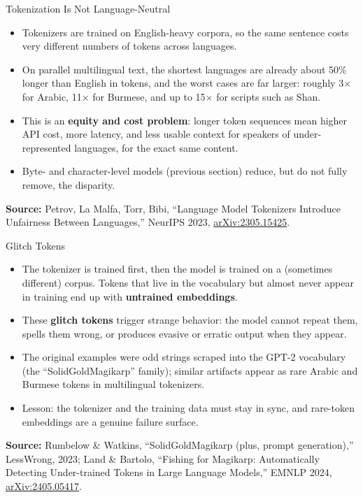 \begin{frame}{Tokenization Is Not Language-Neutral}
  \begin{itemize}\itemsep0.5em
    \item[\textcolor{red}{$\blacktriangleright$}] Tokenizers are trained on English-heavy corpora, so the same sentence costs very different numbers of tokens across languages.
    \item[\textcolor{red}{$\blacktriangleright$}] On parallel multilingual text, the shortest languages are already about 50\% longer than English in tokens, and the worst cases are far larger: roughly 3$\times$ for Arabic, 11$\times$ for Burmese, and up to 15$\times$ for scripts such as Shan.
    \item[\textcolor{red}{$\blacktriangleright$}] This is an \textbf{equity and cost problem}: longer token sequences mean higher API cost, more latency, and less usable context for speakers of under-represented languages, for the exact same content.
    \item[\textcolor{red}{$\blacktriangleright$}] Byte- and character-level models (previous section) reduce, but do not fully remove, the disparity.
  \end{itemize}
  \vspace{0.4em}
  {\scriptsize \textbf{Source:} Petrov, La Malfa, Torr, Bibi, ``Language Model Tokenizers Introduce Unfairness Between Languages,'' NeurIPS 2023, \href{https://arxiv.org/abs/2305.15425}{arXiv:2305.15425}.}
\end{frame}

\begin{frame}{Glitch Tokens}
  \begin{itemize}\itemsep0.5em
    \item[\textcolor{red}{$\blacktriangleright$}] The tokenizer is trained first, then the model is trained on a (sometimes different) corpus. Tokens that live in the vocabulary but almost never appear in training end up with \textbf{untrained embeddings}.
    \item[\textcolor{red}{$\blacktriangleright$}] These \textbf{glitch tokens} trigger strange behavior: the model cannot repeat them, spells them wrong, or produces evasive or erratic output when they appear.
    \item[\textcolor{red}{$\blacktriangleright$}] The original examples were odd strings scraped into the GPT-2 vocabulary (the ``SolidGoldMagikarp'' family); similar artifacts appear as rare Arabic and Burmese tokens in multilingual tokenizers.
    \item[\textcolor{red}{$\blacktriangleright$}] Lesson: the tokenizer and the training data must stay in sync, and rare-token embeddings are a genuine failure surface.
  \end{itemize}
  \vspace{0.4em}
  {\scriptsize \textbf{Source:} Rumbelow \& Watkins, ``SolidGoldMagikarp (plus, prompt generation),'' LessWrong, 2023; Land \& Bartolo, ``Fishing for Magikarp: Automatically Detecting Under-trained Tokens in Large Language Models,'' EMNLP 2024, \href{https://arxiv.org/abs/2405.05417}{arXiv:2405.05417}.}
\end{frame}
